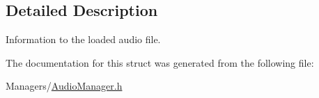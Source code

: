 \subsection{Detailed Description}
Information to the loaded audio file. 

The documentation for this struct was generated from the following file\+:\begin{DoxyCompactItemize}
\item 
Managers/\hyperlink{AudioManager_8h}{Audio\+Manager.\+h}\end{DoxyCompactItemize}
